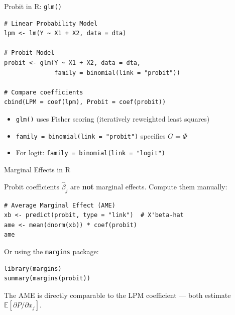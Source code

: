 \documentclass[aspectratio=169]{beamer}
\numberwithin{equation}{section}
\begin{document}
\begin{frame}[fragile]{Probit in R: \texttt{glm()}}

\begin{lstlisting}
# Linear Probability Model
lpm <- lm(Y ~ X1 + X2, data = dta)

# Probit Model
probit <- glm(Y ~ X1 + X2, data = dta,
              family = binomial(link = "probit"))

# Compare coefficients
cbind(LPM = coef(lpm), Probit = coef(probit))
\end{lstlisting}

\pause

\bigskip

\begin{itemize}
    \item \texttt{glm()} uses Fisher scoring (iteratively reweighted least squares)
    \item \texttt{family = binomial(link = "probit")} specifies $G = \Phi$
    \item For logit: \texttt{family = binomial(link = "logit")}
\end{itemize}

\end{frame}


\begin{frame}[fragile]{Marginal Effects in R}

Probit coefficients $\hat\beta_j$ are \textbf{not} marginal effects. Compute them manually:

\begin{lstlisting}
# Average Marginal Effect (AME)
xb <- predict(probit, type = "link")  # X'beta-hat
ame <- mean(dnorm(xb)) * coef(probit)
ame
\end{lstlisting}

\pause

\bigskip

Or using the \texttt{margins} package:

\begin{lstlisting}
library(margins)
summary(margins(probit))
\end{lstlisting}

\pause

The AME is directly comparable to the LPM coefficient --- both estimate $\mathbb{E}[\partial P / \partial x_j]$.

\end{frame}
\end{document}
